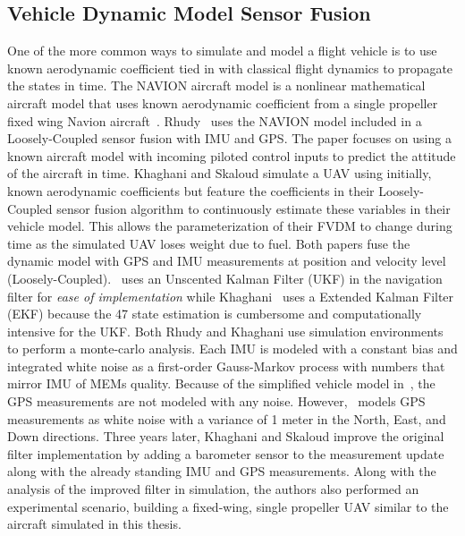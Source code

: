 \subsection{Vehicle Dynamic Model Sensor Fusion}
One of the more common ways to simulate and model a flight vehicle is to use known aerodynamic coefficient tied in with classical flight dynamics to propagate the states in time. The NAVION aircraft model is a nonlinear mathematical aircraft model that uses known aerodynamic coefficient from a single propeller fixed wing Navion aircraft~\cite{nelsonFlightStabilityAutomatic1998}. Rhudy~\cite{rhudyDynamicModelaidedSensor2017} uses the NAVION model included in a Loosely-Coupled sensor fusion with IMU and GPS\@. The paper focuses on using a known aircraft model with incoming piloted control inputs to predict the attitude of the aircraft in time. Khaghani and Skaloud simulate a UAV using initially, known aerodynamic coefficients but feature the coefficients in their Loosely-Coupled sensor fusion algorithm to continuously estimate these variables in their vehicle model. This allows the parameterization of their FVDM to change during time as the simulated UAV loses weight due to fuel. Both papers fuse the dynamic model with GPS and IMU measurements at position and velocity level (Loosely-Coupled).~\cite{rhudyDynamicModelaidedSensor2017} uses an Unscented Kalman Filter (UKF) in the navigation filter for \textit{ease of implementation} while Khaghani~\cite{khaghaniAutonomousVehicleDynamic2016,khaghaniAssessmentVDMbasedAutonomous2018} uses a Extended Kalman Filter (EKF) because the 47 state estimation is cumbersome and computationally intensive for the UKF\@. Both Rhudy and Khaghani use simulation environments to perform a monte-carlo analysis. Each IMU is modeled with a constant bias and integrated white noise as a first-order Gauss-Markov process with numbers that mirror IMU of MEMs quality. Because of the simplified vehicle model in~\cite{rhudyDynamicModelaidedSensor2017}, the GPS measurements are not modeled with any noise. However,~\cite{khaghaniAutonomousVehicleDynamic2016} models GPS measurements as white noise with a variance of 1 meter in the North, East, and Down directions. Three years later, Khaghani and Skaloud improve the original filter implementation by adding a barometer sensor to the measurement update along with the already standing IMU and GPS measurements. Along with the analysis of the improved filter in simulation, the authors also performed an experimental scenario, building a fixed-wing, single propeller UAV similar to the aircraft simulated in this thesis.

